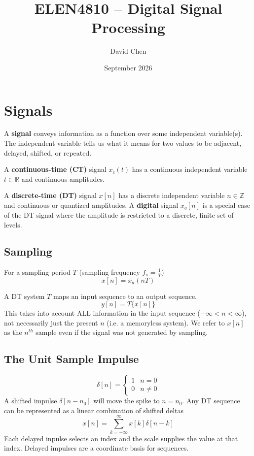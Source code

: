 \documentclass{article}
\title{ELEN4810 -- Digital Signal Processing}
\author{David Chen}
\date{September 2026}
\begin{document}
\maketitle

\section{Signals}
A \textbf{signal} conveys information as a function over some independent variable(s). The independent variable tells us what it means for two values to be adjacent, delayed, shifted, or repeated.

A \textbf{continuous-time (CT)} signal $x_c(t)$ has a continuous independent variable $t\in\mathbb{R}$ and continuous amplitudes.

A \textbf{discrete-time (DT)} signal $x[n]$ has a discrete independent variable $n\in\mathbb{Z}$ and continuous or quantized amplitudes. A \textbf{digital} signal $x_q[n]$ is a special case of the DT signal where the amplitude is restricted to a discrete, finite set of levels.

\subsection{Sampling}
For a sampling period $T$ (sampling frequency $f_s=\frac{1}{T}$)
\begin{equation}
    x[n]=x_a(nT)
\end{equation}


A DT system $\textit{T}$ maps an input sequence to an output sequence.
\begin{equation}
    y[n] = \textit{T}\{x[n]\}
\end{equation}
This takes into account ALL information in the input sequence ($-\infty<n<\infty$), not necessarily just the present $n$ (i.e. a memoryless system). We refer to $x[n]$ as the $n^{th}$ sample even if the signal was not generated by sampling.

\subsection{The Unit Sample Impulse}
\[
    \delta[n] = \begin{cases}
    1 & n=0\\
    0 & n\ne0
    \end{cases}
\]
A shifted impulse $\delta[n-n_0]$ will move the spike to $n=n_0$. Any DT sequence can be represented as a linear combination of shifted deltas
\[
    x[n] = \sum_{k=-\infty}^\infty x[k]\delta[n-k]
\]
Each delayed inpulse selects an index and the scale supplies the value at that index. Delayed impulses are a coordinate basis for sequences.
\end{document}
